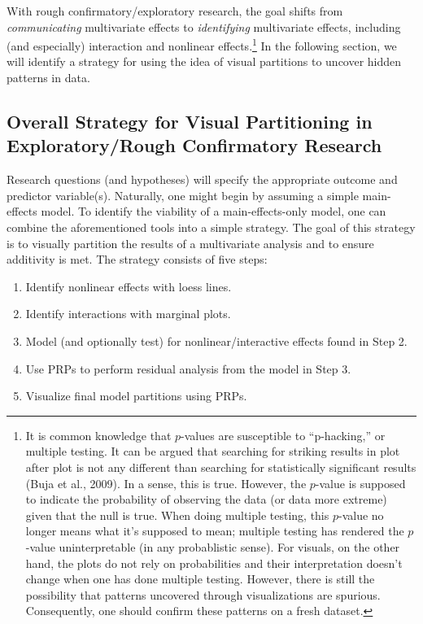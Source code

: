 \documentclass[
  man,floatsintext]{apa6}
\providecommand{\tightlist}{%
  \setlength{\itemsep}{0pt}\setlength{\parskip}{0pt}}
\begin{document}
With rough confirmatory/exploratory research, the goal shifts from \emph{communicating} multivariate effects to \emph{identifying} multivariate effects, including (and especially) interaction and nonlinear effects.\footnote{It is common knowledge that \(p\)-values are susceptible to ``p-hacking,'' or multiple testing. It can be argued that searching for striking results in plot after plot is not any different than searching for statistically significant results (Buja et al., 2009). In a sense, this is true. However, the \(p\)-value is supposed to indicate the probability of observing the data (or data more extreme) given that the null is true. When doing multiple testing, this \(p\)-value no longer means what it's supposed to mean; multiple testing has rendered the \(p\)-value uninterpretable (in any probablistic sense). For visuals, on the other hand, the plots do not rely on probabilities and their interpretation doesn't change when one has done multiple testing. However, there is still the possibility that patterns uncovered through visualizations are spurious. Consequently, one should confirm these patterns on a fresh dataset.} In the following section, we will identify a strategy for using the idea of visual partitions to uncover hidden patterns in data.

\subsection{Overall Strategy for Visual Partitioning in Exploratory/Rough Confirmatory Research}\label{overall-strategy-for-visual-partitioning-in-exploratoryrough-confirmatory-research}

Research questions (and hypotheses) will specify the appropriate outcome and predictor variable(s). Naturally, one might begin by assuming a simple main-effects model. To identify the viability of a main-effects-only model, one can combine the aforementioned tools into a simple strategy. The goal of this strategy is to visually partition the results of a multivariate analysis and to ensure additivity is met. The strategy consists of five steps:

\begin{enumerate}
\def\labelenumi{\arabic{enumi}.}
\tightlist
\item
  Identify nonlinear effects with loess lines.
\item
  Identify interactions with marginal plots.
\item
  Model (and optionally test) for nonlinear/interactive effects found in Step 2.
\item
  Use PRPs to perform residual analysis from the model in Step 3.
\item
  Visualize final model partitions using PRPs.
\end{enumerate}
\end{document}
